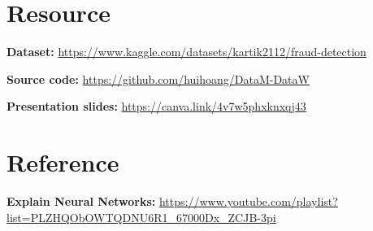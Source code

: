 \newpage
\section{Resource}

\textbf{Dataset:} \url{https://www.kaggle.com/datasets/kartik2112/fraud-detection}

\textbf{Source code:} \url{https://github.com/huihoang/DataM-DataW}

\textbf{Presentation slides:} \url{https://canva.link/4v7w5phxknxqj43}



\section{Reference}
\textbf{Explain Neural Networks:} \url{https://www.youtube.com/playlist?list=PLZHQObOWTQDNU6R1_67000Dx_ZCJB-3pi}
